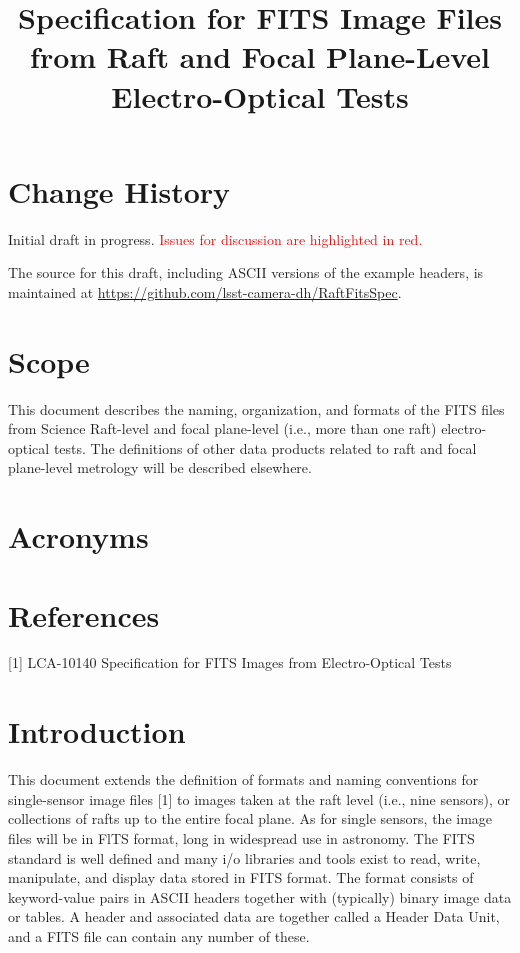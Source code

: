 \documentclass{article}[12pt]
\title{Specification for FITS Image Files from Raft and Focal Plane-Level Electro-Optical Tests}
\newcommand{\red}{\textcolor{red}}
\begin{document}
\maketitle
\tableofcontents

\section{Change History}
Initial draft in progress.  \red{Issues for discussion are highlighted in red.}

The source for this draft, including ASCII versions of the example headers, is maintained at \url{https://github.com/lsst-camera-dh/RaftFitsSpec}.

\section{Scope}
This document describes the naming, organization, and formats of the FITS files from Science Raft-level and focal plane-level (i.e., more than one raft) electro-optical tests.  The definitions of other data products related to raft and focal plane-level metrology will be described elsewhere.

\section{Acronyms}

\section{References}

[1] LCA-10140 Specification for FITS Images from Electro-Optical Tests



\section{Introduction}
This document extends the definition of formats and naming conventions for single-sensor image files [1] to images taken at the raft level (i.e., nine sensors), or collections of rafts up to the entire focal plane.  As for single sensors, the image files will be in FlTS format, long in widespread use in astronomy.  The FITS standard is well defined and many i/o libraries and tools exist to read, write, manipulate, and display data stored in FITS format.  The format consists of keyword-value pairs in ASCII headers together with (typically) binary image data or tables.  A header and associated data are together called a Header Data Unit, and a FITS file can contain any number of these.
\end{document}
